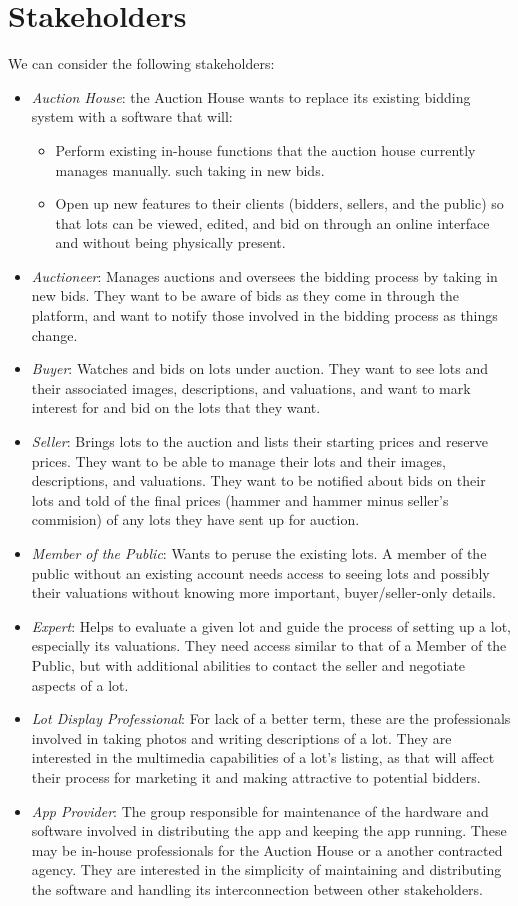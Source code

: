 \documentclass[titlepage, 12pt]{extarticle}
\begin{document}
\section{Stakeholders}
We can consider the following stakeholders:
\begin{itemize}
\item {\it Auction House}: the Auction House wants to replace its existing bidding system with a software that will:
  \begin{itemize}
  \item Perform existing in-house functions that the auction house currently manages manually. such taking in new bids.
  \item Open up new features to their clients (bidders, sellers, and the public) so that lots can be viewed, edited, and bid on through an online interface and without being physically present.
  \end{itemize}
\item {\it Auctioneer}: Manages auctions and oversees the bidding process by taking in new bids. They want to be aware of bids as they come in through the platform, and want to notify those involved in the bidding process as things change.
\item {\it Buyer}: Watches and bids on lots under auction. They want to see lots and their associated images, descriptions, and valuations, and want to mark interest for and bid on the lots that they want.
\item {\it Seller}: Brings lots to the auction and lists their starting prices and reserve prices. They want to be able to manage their lots and their images, descriptions, and valuations. They want to be notified about bids on their lots and told of the final prices (hammer and hammer minus seller's commision) of any lots they have sent up for auction.
\item {\it Member of the Public}: Wants to peruse the existing lots. A member of the public without an existing account needs access to seeing lots and possibly their valuations without knowing more important, buyer/seller-only details.
\item {\it Expert}: Helps to evaluate a given lot and guide the process of setting up a lot, especially its valuations. They need access similar to that of a Member of the Public, but with additional abilities to contact the seller and negotiate aspects of a lot.
\item {\it Lot Display Professional}: For lack of a better term, these are the professionals involved in taking photos and writing descriptions of a lot. They are interested in the multimedia capabilities of a lot's listing, as that will affect their process for marketing it and making attractive to potential bidders.
\item {\it App Provider}: The group responsible for maintenance of the hardware and software involved in distributing the app and keeping the app running. These may be in-house professionals for the Auction House or a another contracted agency. They are interested in the simplicity of maintaining and distributing the software and handling its interconnection between other stakeholders.
\end{itemize}
\end{document}
